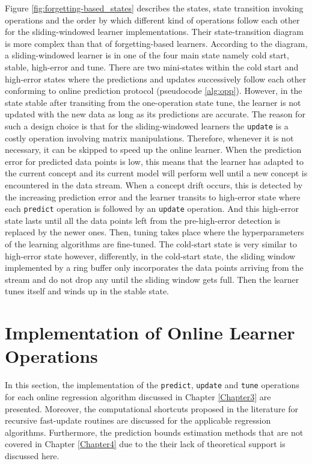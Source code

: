 Figure \ref{fig:forgetting-based_states} describes the states, state transition invoking operations and the order by which different kind of operations follow each other for the sliding-windowed learner implementations. Their state-transition diagram is more complex than that of forgetting-based learners. According to the diagram, a sliding-windowed learner is in one of the four main state namely cold start, stable, high-error and tune. There are two mini-states within the cold start and high-error states where the predictions and updates successively follow each other conforming to online prediction protocol (pseudocode \ref{alg:opp}). However, in the state stable after transiting from the one-operation state tune, the learner is not updated with the new data as long as its predictions are accurate. The reason for such a design choice is that for the sliding-windowed learners the \texttt{update} is a costly operation involving matrix manipulations. Therefore, whenever it is not necessary, it can be skipped to speed up the online learner. When the prediction error for predicted data points is low, this means that the learner has adapted to the current concept and its current model will perform well until a new concept is encountered in the data stream. When a concept drift occurs, this is detected by the increasing prediction error and the learner transits to high-error state where each \texttt{predict} operation is followed by an \texttt{update} operation. And this high-error state lasts until all the data points left from the pre-high-error detection is replaced by the newer ones. Then, tuning takes place where the hyperparameters of the learning algorithms are fine-tuned. The cold-start state is very similar to high-error state however, differently, in the cold-start state, the sliding window implemented by a ring buffer only incorporates the data points arriving from the stream and do not drop any until the sliding window gets full. Then the learner tunes itself and winds up in the stable state.

\section{Implementation of Online Learner Operations}

In this section, the implementation of the \texttt{predict}, \texttt{update} and \texttt{tune} operations for each online regression algorithm discussed in Chapter \ref{Chapter3} are presented. Moreover, the computational shortcuts proposed in the literature for recursive fast-update routines are discussed for the applicable regression algorithms. Furthermore, the prediction bounds estimation methods that are not covered in Chapter \ref{Chapter4} due to the their lack of theoretical support is discussed here.

